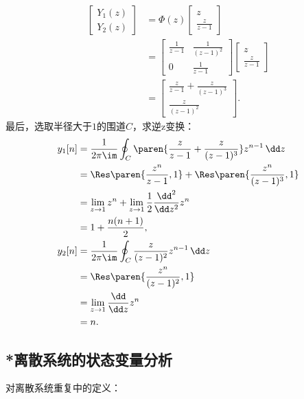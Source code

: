 \begin{example}
\begin{align}
\begin{bmatrix}
            Y_1(z) \\
            Y_2(z)
        \end{bmatrix}&=\Phi(z)\begin{bmatrix}
            z \\
            \frac{z}{z-1}
        \end{bmatrix} \nonumber \\
        &=\begin{bmatrix}
            \frac{1}{z-1} & \frac{1}{(z-1)^2} \\
            0             & \frac{1}{z-1}
        \end{bmatrix}\begin{bmatrix}
            z \\
            \frac{z}{z-1}
        \end{bmatrix} \nonumber \\
        &=\begin{bmatrix}
            \frac{z}{z-1}+\frac{z}{(z-1)^3} \\
            \frac{z}{(z-1)^2}
        \end{bmatrix}.
    \end{align}
    最后，选取半径大于$1$的围道$C$，求逆z变换：
    \begin{align}
        y_1[n]&=\frac{1}{2\pi\im}\oint_C \paren{\frac{z}{z-1}+\frac{z}{(z-1)^3}}z^{n-1}\,\dd z \nonumber \\
        &=\Res\paren{\frac{z^n}{z-1},1}+\Res\paren{\frac{z^n}{(z-1)^3},1} \nonumber \\
        &=\lim_{z\to 1}z^n+\lim_{z\to 1}\frac{1}{2}\frac{\dd^2}{\dd z^2}z^n \nonumber \\
        &=1+\frac{n(n+1)}{2}, \\
        y_2[n]&=\frac{1}{2\pi\im}\oint_C \frac{z}{(z-1)^2}z^{n-1}\,\dd z \nonumber \\
        &=\Res\paren{\frac{z^n}{(z-1)^2},1} \nonumber \\
        &=\lim_{z\to 1}\frac{\dd}{\dd z}z^n \nonumber \\
        &=n.
    \end{align}
\end{example}

\subsection{*离散系统的状态变量分析}\label{sub:discrete_state_variable}

对离散系统重复中的定义：

